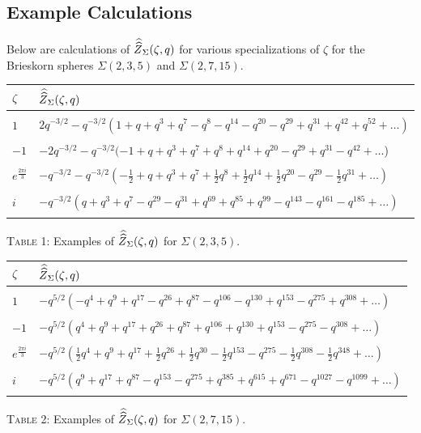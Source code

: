 \documentclass[11pt,letterpaper]{amsart}
\theoremstyle{definition}
\theoremstyle{plain}
\newcommand{\Zhathat}{\widehat{\vphantom{\rule{5pt}{10pt}}\smash{\widehat{Z}}\,}\!}
\numberwithin{equation}{section}
\theoremstyle{example}
\begin{document}
\subsection{Example Calculations} 
Below are calculations of $\Zhathat_{\Sigma}(\zeta, q)$ for various specializations of $\zeta$ for the Brieskorn spheres $\Sigma(2,3,5)$ and $\Sigma(2,7,15)$.
\small
\begin{center}
\begin{tabular}{|l|l|}
\hline
$\zeta$ & $\Zhathat_{\Sigma}(\zeta, q)$ \\
\hline
& \\
$1$ & $ 2q^{-3/2}- q^{-3/2}(1 + q + q^3 + q^7 - q^8 - q^{14} - q^{20} - q^{29} + q^{31} + q^{42} + q^{52} + \ldots)$ \\  & \\
$-1$ & $-2q^{-3/2}- q^{-3/2}(-1 + q + q^3 + q^7 + q^8 + q^{14} + q^{20} - q^{29} + q^{31} - q^{42}  + \ldots$)\\ & \\
$e^{\frac{2\pi i}{3}}$ & $ -q^{-3/2} - q^{-3/2}(-\frac{1}{2} + q + q^3 + q^7 + \frac{1}{2} q^8 + \frac{1}{2} q^{14} + \frac{1}{2} q^{20} - q^{29} - \frac{1}{2} q^{31}  + \ldots)$\\ & \\
$i$ & $-q^{-3/2}(q + q^3 + q^7 - q^{29} - q^{31} + q^{69} + q^{85} + q^{99} - q^{143} - q^{161} - q^{185}  +  \ldots)$\\ 
& \\
\hline
\end{tabular}
\end{center}
\begin{center}
\textsc{Table 1}: Examples of $\Zhathat_{\Sigma}(\zeta, q)$ for $\Sigma(2,3,5)$.
\end{center}

\small
\begin{center}
\begin{tabular}{|l|l|}
\hline
$\zeta$ & $\Zhathat_{\Sigma}(\zeta, q)$ \\
\hline
& \\
$1$ & $-q^{5/2}( -q^4 + q^9 + q^{17} - q^{26} + q^{87} - q^{106} - q^{130} + q^{153} - q^{275}+ q^{308}  + \dots) $\\  & \\
$-1$ & $-q^{5/2}(q^4 + q^9 + q^{17} + q^{26} + q^{87} + q^{106} + q^{130} + q^{153} - q^{275} - q^{308} + \dots) $ \\ & \\
$e^{\frac{2\pi i}{3}}$ & $-q^{5/2}(\frac{1}{2}q^4 + q^9 + q^{17} + \frac{1}{2}q^{26} + \frac{1}{2}q^{30} - \frac{1}{2}q^{153} - q^{275} - \frac{1}{2}q^{308} - \frac{1}{2}q^{348} + \dots) $
\\ & \\
$i$ & $-q^{5/2}( q^9 + q^{17} + q^{87} - q^{153} - q^{275} + q^{385} + q^{615} + q^{671} - q^{1027} - q^{1099} + \dots) $
\\ 
& \\
\hline
\end{tabular}
\end{center}
\begin{center}
\textsc{Table 2}: Examples of $\Zhathat_{\Sigma}(\zeta, q)$ for $\Sigma(2,7,15)$.
\end{center}
\normalsize
\end{document}
